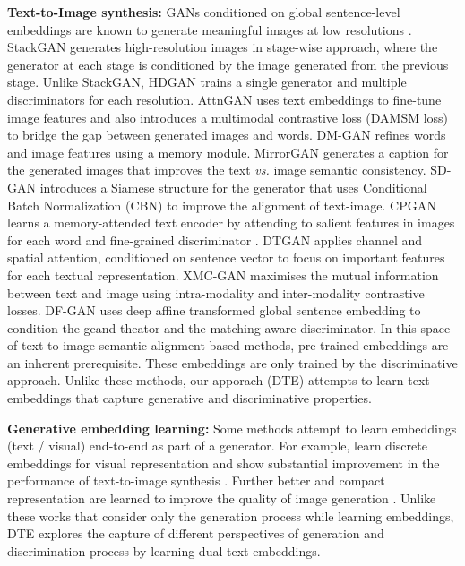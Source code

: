\noindent \textbf{Text-to-Image synthesis:} GANs conditioned on global sentence-level embeddings are known to generate meaningful images at low resolutions \citep{GAWWN,tacgan,reed2016generative}. StackGAN \citep{stack_gan} generates high-resolution images in stage-wise approach, where the generator at each stage is conditioned by the image generated from the previous stage. Unlike StackGAN, HDGAN \citep{hd_gan} trains a single generator and multiple discriminators for each resolution. 
AttnGAN \citep{AttnGAN} uses text embeddings to fine-tune image features and also introduces a multimodal contrastive loss (DAMSM loss) to bridge the gap between generated images and words. DM-GAN \citep{DMGAN} refines words and image features using a memory module. MirrorGAN \citep{MirrorGAN} generates a caption for the generated images that improves the text \textit{vs.} image semantic consistency. SD-GAN \citep{SDGAN} introduces a Siamese structure for the generator that uses Conditional Batch Normalization (CBN) \citep{CBN} to improve the alignment of text-image. CPGAN \citep{CPGAN} learns a memory-attended text encoder by attending to salient features in images for each word and fine-grained discriminator \citep{control_gan}.  DTGAN \citep{DTGAN} applies channel and spatial attention, conditioned on sentence vector to focus on important features for each textual representation. XMC-GAN \citep{XMC-GAN} maximises the mutual information between text and image using intra-modality and inter-modality contrastive losses. DF-GAN \citep{DF_GAN_CVPR} uses deep affine transformed global sentence embedding to condition the geand theator and the matching-aware discriminator. 
In this space of text-to-image semantic alignment-based methods, pre-trained embeddings are an inherent prerequisite. These embeddings are only trained by the discriminative approach. Unlike these methods, our apporach (DTE) attempts to learn text embeddings that capture generative and discriminative properties.  

\noindent \textbf{Generative embedding learning:} Some methods attempt to learn embeddings (text / visual) end-to-end as part of a generator. For example, \citep{NDR,VQGAN} learn discrete embeddings for visual representation and show substantial improvement in the performance of text-to-image synthesis \citep{DALL-E,CogView}. Further better and compact representation are learned to improve the quality of image generation \citep{vq_vae_2,res_quatizer,make_a_scene}. Unlike these works that consider only the generation process while learning embeddings, DTE explores the capture of different perspectives of generation and discrimination process by learning dual text embeddings.

